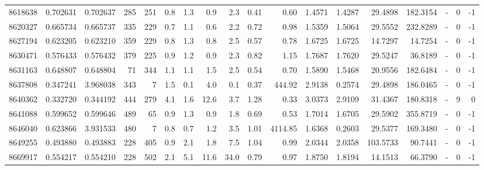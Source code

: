 \begin{tabular}{rrrrrrrrrrrrrrrlrr}
   8618638 & 0.702631 &   0.702637 &  285 &  251 &      0.8 &      1.3 &     0.9 &      2.3 &       0.41 &        0.60 &  1.4571 &  1.4287 &   29.4898 &  182.3154 &             - &        0 &         -1 \\
   8620327 & 0.665734 &   0.665737 &  335 &  229 &      0.7 &      1.1 &     0.6 &      2.2 &       0.72 &        0.98 &  1.5359 &  1.5064 &   29.5552 &  232.8289 &             - &        0 &         -1 \\
   8627194 & 0.623205 &   0.623210 &  359 &  229 &      0.8 &      1.3 &     0.8 &      2.5 &       0.57 &        0.78 &  1.6725 &  1.6725 &   14.7297 &   14.7254 &             - &        0 &         -1 \\
   8630471 & 0.576433 &   0.576432 &  379 &  225 &      0.9 &      1.2 &     0.9 &      2.3 &       0.82 &        1.15 &  1.7687 &  1.7620 &   29.5247 &   36.8189 &             - &        0 &         -1 \\
   8631163 & 0.648807 &   0.648804 &   71 &  344 &      1.1 &      1.1 &     1.5 &      2.5 &       0.54 &        0.70 &  1.5890 &  1.5468 &   20.9556 &  182.6484 &             - &        0 &         -1 \\
   8637808 & 0.347241 &   3.968038 &  343 &    7 &      1.5 &      0.1 &     4.0 &      0.1 &       0.37 &      444.92 &  2.9138 &  0.2574 &   29.4898 &  186.0465 &             - &        0 &         -1 \\
   8640362 & 0.332720 &   0.344192 &  444 &  279 &      4.1 &      1.6 &    12.6 &      3.7 &       1.28 &        0.33 &  3.0373 &  2.9109 &   31.4367 &  180.8318 &             - &        9 &          0 \\
   8641088 & 0.599652 &   0.599646 &  489 &   65 &      0.9 &      1.3 &     0.9 &      1.8 &       0.69 &        0.53 &  1.7014 &  1.6705 &   29.5902 &  355.8719 &             - &        0 &         -1 \\
   8646040 & 0.623866 &   3.931533 &  480 &    7 &      0.8 &      0.7 &     1.2 &      3.5 &       1.01 &     4114.85 &  1.6368 &  0.2603 &   29.5377 &  169.3480 &             - &        0 &         -1 \\
   8649255 & 0.493880 &   0.493883 &  228 &  405 &      0.9 &      2.1 &     1.8 &      7.5 &       1.04 &        0.99 &  2.0344 &  2.0358 &  103.5733 &   90.7441 &             - &        0 &         -1 \\
   8669917 & 0.554217 &   0.554210 &  228 &  502 &      2.1 &      5.1 &    11.6 &     34.0 &       0.79 &        0.97 &  1.8750 &  1.8194 &   14.1513 &   66.3790 &             - &        0 &         -1 \\

\end{tabular}
